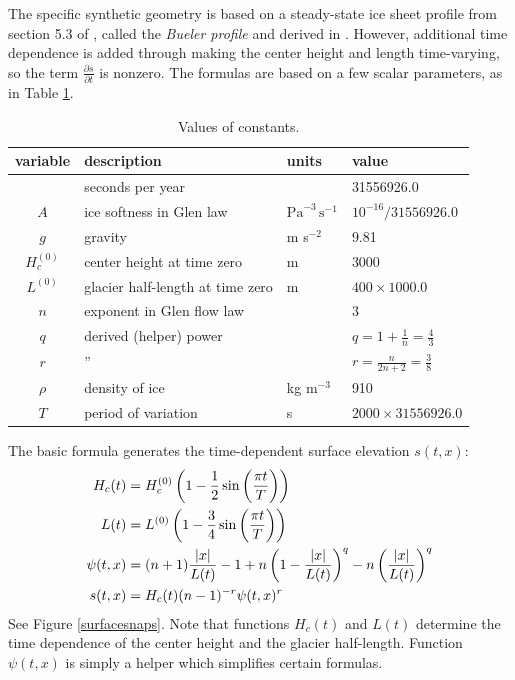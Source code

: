 \documentclass[letterpaper,final,12pt,reqno]{amsart}
\begin{document}
The specific synthetic geometry is based on a steady-state ice sheet profile from section 5.3 of \cite{vanderVeen2013}, called the \emph{Bueler profile} and derived in \cite{Bueler2003}.  However, additional time dependence is added through making the center height and length time-varying, so the term $\frac{\partial s}{\partial t}$ is nonzero.  The formulas are based on a few scalar parameters, as in Table \ref{constantstable}.

\begin{table}
\begin{tabular}{clll}
variable  & description & units & value \\
\hline
    & seconds per year &  & 31556926.0 \\
$A$ & ice softness in Glen law & $\text{Pa}^{-3}\,\text{s}^{-1}$ & $10^{-16}/31556926.0$ \\
$g$ & gravity & m s$^{-2}$ & 9.81 \\
$H_c^{(0)}$ & center height at time zero & m & 3000 \\
$L^{(0)}$ & glacier half-length at time zero & m & $400 \times 1000.0$ \\
$n$ & exponent in Glen flow law & & 3 \\
$q$ & derived (helper) power & & $q = 1+\frac{1}{n} = \frac{4}{3}$ \\
$r$ & \qquad '' & & $r = \frac{n}{2n+2} = \frac{3}{8}$ \\
$\rho$ & density of ice & kg m$^{-3}$ & 910 \\
$T$ & period of variation & s & $2000 \times 31556926.0$
\end{tabular}
\caption{Values of constants.}
\label{constantstable}
\end{table}

The basic formula generates the time-dependent surface elevation $s(t,x)$: 
\begin{align}
H_c(t) &= H_c^{(0)} \left(1 - \frac{1}{2} \sin\left(\frac{\pi t}{T}\right)\right) \notag \\
L(t) &= L^{(0)} \left(1 - \frac{3}{4} \sin\left(\frac{\pi t}{T}\right)\right) \notag\\
\psi(t,x) &= (n+1) \frac{|x|}{L(t)} - 1 + n \left(1 - \frac{|x|}{L(t)}\right)^q - n \left(\frac{|x|}{L(t)}\right)^q \notag \\
s(t,x) &= H_c(t) (n-1)^{-r} \psi(t,x)^r \label{sformula}
\end{align}
See Figure \ref{surfacesnaps}.  Note that functions $H_c(t)$ and $L(t)$ determine the time dependence of the center height and the glacier half-length.  Function $\psi(t,x)$ is simply a helper which simplifies certain formulas.
\end{document}
